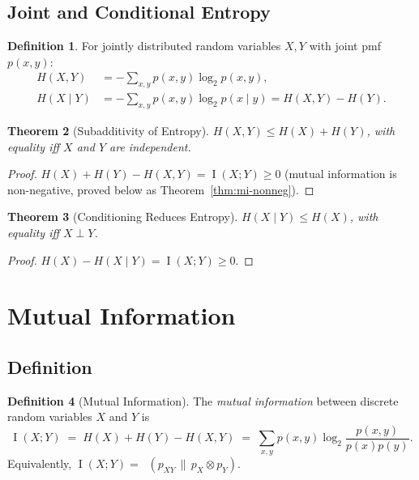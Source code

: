 \documentclass[12pt,a4paper]{amsart}
\newtheorem{theorem}{Theorem}[section]
\theoremstyle{definition}
\newtheorem{definition}[theorem]{Definition}
\theoremstyle{remark}
\DeclareMathOperator{\MI}{I}
\DeclareMathOperator{\KL}{D_{KL}}
\begin{document}
\subsection{Joint and Conditional Entropy}

\begin{definition}
For jointly distributed random variables $X, Y$ with joint pmf $p(x,y)$:
\begin{align}
  H(X,Y) &= -\sum_{x,y} p(x,y)\log_2 p(x,y), \\
  H(X \mid Y) &= -\sum_{x,y} p(x,y)\log_2 p(x \mid y) = H(X,Y) - H(Y).
\end{align}
\end{definition}

\begin{theorem}[Subadditivity of Entropy]\label{thm:subadd}
$H(X,Y) \leq H(X) + H(Y)$, with equality iff $X$ and $Y$ are independent.
\end{theorem}
\begin{proof}
$H(X) + H(Y) - H(X,Y) = \MI(X;Y) \geq 0$
(mutual information is non-negative, proved below as Theorem~\ref{thm:mi-nonneg}).
\end{proof}

\begin{theorem}[Conditioning Reduces Entropy]\label{thm:condred}
$H(X \mid Y) \leq H(X)$, with equality iff $X \perp Y$.
\end{theorem}
\begin{proof}
$H(X) - H(X\mid Y) = \MI(X;Y) \geq 0$.
\end{proof}

\section{Mutual Information}

\subsection{Definition}

\begin{definition}[Mutual Information]
The \emph{mutual information} between discrete random variables $X$ and $Y$ is
\begin{equation}\label{eq:mi}
  \MI(X;Y) \;=\; H(X) + H(Y) - H(X,Y)
  \;=\; \sum_{x,y} p(x,y)\log_2\frac{p(x,y)}{p(x)p(y)}.
\end{equation}
Equivalently, $\MI(X;Y) = \KL(p_{XY} \,\|\, p_X \otimes p_Y)$.
\end{definition}
\end{document}
